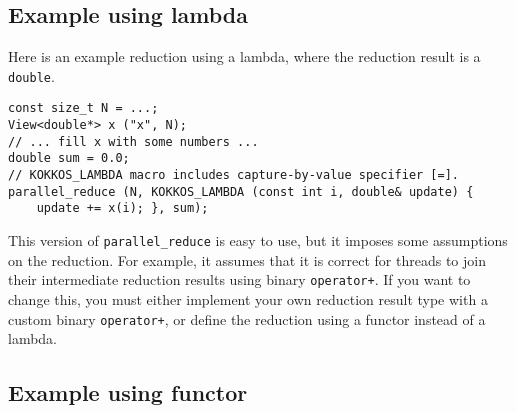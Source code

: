 \subsection{Example using lambda}

Here is an example reduction using a lambda,
where the reduction result is a \lstinline!double!.
\begin{lstlisting}
const size_t N = ...;
View<double*> x ("x", N);
// ... fill x with some numbers ... 
double sum = 0.0;
// KOKKOS_LAMBDA macro includes capture-by-value specifier [=].
parallel_reduce (N, KOKKOS_LAMBDA (const int i, double& update) {
    update += x(i); }, sum);
\end{lstlisting}
This version of \verb!parallel_reduce! is easy to use,
but it imposes some assumptions on the reduction.
For example, it assumes that it is correct for threads to join their intermediate reduction results using binary \lstinline!operator+!.
If you want to change this, you must either implement your own reduction result type with a custom binary \lstinline!operator+!,
or define the reduction using a functor instead of a lambda.

\subsection{Example using functor}

